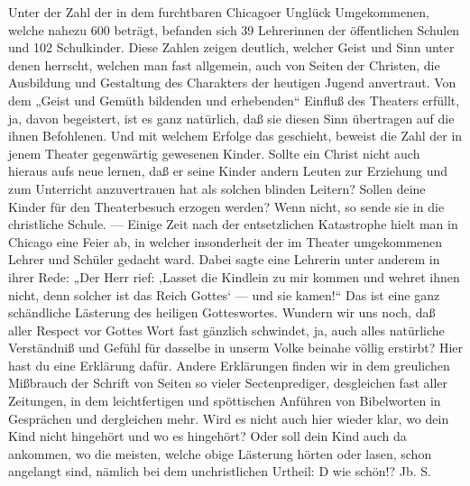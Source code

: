 Unter der Zahl der in dem furchtbaren Chicagoer Unglück Umgekommenen, welche nahezu 600 beträgt, befanden sich 39 Lehrerinnen der öffentlichen Schulen und 102 Schulkinder. Diese Zahlen zeigen deutlich, welcher Geist und Sinn unter denen herrscht, welchen man fast allgemein, auch von Seiten der Christen, die Ausbildung und Gestaltung des Charakters der heutigen Jugend anvertraut. Von dem „Geist und Gemüth bildenden und erhebenden“ Einfluß des Theaters erfüllt, ja, davon begeistert, ist es ganz natürlich, daß sie diesen Sinn übertragen auf die ihnen Befohlenen. Und mit welchem Erfolge das geschieht, beweist die Zahl der in jenem Theater gegenwärtig gewesenen Kinder. Sollte ein Christ nicht auch hieraus aufs neue lernen, daß er seine Kinder andern Leuten zur Erziehung und zum Unterricht anzuvertrauen hat als solchen blinden Leitern? Sollen deine Kinder für den Theaterbesuch erzogen werden? Wenn nicht, so sende sie in die christliche Schule. — Einige Zeit nach der entsetzlichen Katastrophe hielt man in Chicago eine Feier ab, in welcher insonderheit der im Theater umgekommenen Lehrer und Schüler gedacht ward. Dabei sagte eine Lehrerin unter anderem in ihrer Rede: „Der Herr rief: ,Lasset die Kindlein zu mir kommen und wehret ihnen nicht, denn solcher ist das Reich Gottes‘ — und sie kamen!“ Das ist eine ganz schändliche Lästerung des heiligen Gotteswortes. Wundern wir uns noch, daß aller Respect vor Gottes Wort fast gänzlich schwindet, ja, auch alles natürliche Verständniß und Gefühl für dasselbe in unserm Volke beinahe völlig erstirbt? Hier hast du eine Erklärung dafür. Andere Erklärungen finden wir in dem greulichen Mißbrauch der Schrift von Seiten so vieler Sectenprediger, desgleichen fast aller Zeitungen, in dem leichtfertigen und spöttischen Anführen von Bibelworten in Gesprächen und dergleichen mehr. Wird es nicht auch hier wieder klar, wo dein Kind nicht hingehört und wo es hingehört? Oder soll dein Kind auch da ankommen, wo die meisten, welche obige Lästerung hörten oder lasen, schon angelangt sind, nämlich bei dem unchristlichen Urtheil: D wie schön!? Jb. S.
